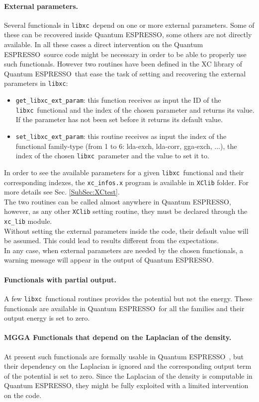 \documentclass[12pt,a4paper]{article}
\def\qe{{\sc Quantum ESPRESSO}}
\def\libxc{\texttt{libxc}}
\begin{document}
\paragraph{External parameters.}
Several functionals in \libxc\ depend on one or more external parameters. Some of these can be recovered inside \qe, some others are not directly available. In all these cases a direct intervention on the \qe\ source code might be necessary in order to be able to properly use such functionals. However two routines have been defined in the XC library of \qe\ that ease the task of setting and recovering the external parameters in \libxc:
\begin{itemize}
	\item \texttt{get\_libxc\_ext\_param}: this function receives as input the ID of the \libxc\ functional and the index of the chosen parameter and returns its value. If the parameter has not been set before it returns its default value.
	\item \texttt{set\_libxc\_ext\_param}: this routine receives as input the index of the functional family-type (from 1 to 6: lda-exch, lda-corr, gga-exch, ...), the index of the chosen \libxc\ parameter and the value to set it to.
\end{itemize}
In order to see the available parameters for a given \libxc\ functional and their corresponding indexes, the \texttt{xc\_infos.x} program is available in \texttt{XClib} folder. For more details see Sec. \ref{SubSec:XCtest}.\\
The two routines can be called almost anywhere in \qe, however, as any other \texttt{XClib} setting routine, they must be declared through the \texttt{xc\_lib} module.\\
Without setting the external parameters inside the code, their default value will be assumed. This could lead to results different from the expectations.\\
In any case, when external parameters are needed by the chosen functionals, a warning message will appear in the output of \qe.
%
\paragraph{Functionals with partial output.}
A few \libxc\ functional routines provides the potential but not the energy. These functionals are available in \qe\ for all the families and their output energy is set to zero.
%
\paragraph{MGGA Functionals that depend on the Laplacian of the density.} At present such functionals are formally usable in \qe\ , but their dependency on the Laplacian is ignored and the corresponding output term of the potential is set to zero. Since the Laplacian of the density is computable in \qe, they might be fully exploited with a limited intervention on the code.
%
\end{document}
